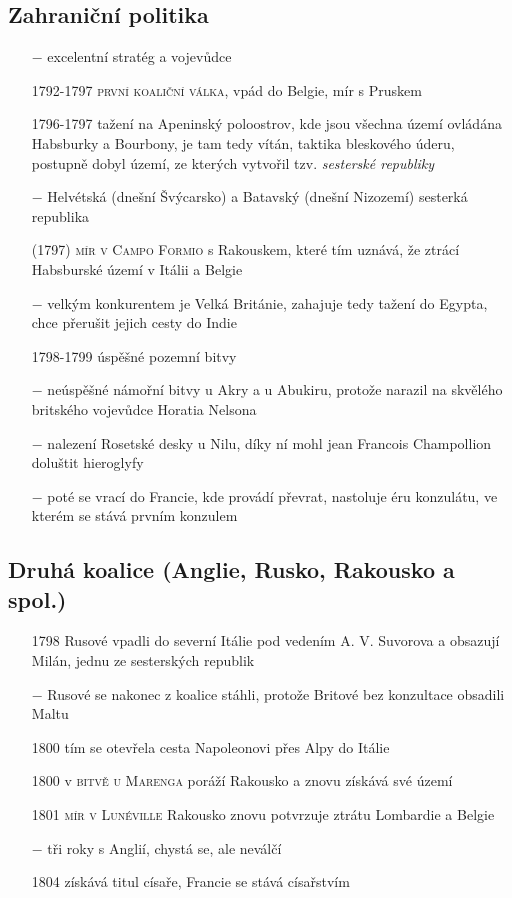 \documentclass{article}
\begin{document}
\subsection*{Zahraniční politika}
\begin{itemize}
    \vspace{-0.5em}
    \setlength\itemsep{0.15em}
    \item[$-$] excelentní stratég a vojevůdce
    \item[1792-1797] \textsc{první koaliční válka}, vpád do Belgie, mír s Pruskem
    \item[1796-1797] tažení na Apeninský poloostrov, kde jsou všechna území ovládána Habsburky a Bourbony, je tam tedy vítán, taktika bleskového úderu, postupně dobyl území, ze kterých vytvořil tzv. \textit{sesterské republiky}
    \item[$-$] Helvétská (dnešní Švýcarsko) a Batavský (dnešní Nizozemí) sesterká republika
    \item[(1797)] \textsc{mír v Campo Formio} s Rakouskem, které tím uznává, že ztrácí Habsburské území v Itálii a Belgie
    \item[$-$] velkým konkurentem je Velká Británie, zahajuje tedy tažení do Egypta, chce přerušit jejich cesty do Indie
    \item[1798-1799] úspěšné pozemní bitvy
    \item[$-$] neúspěšné námořní bitvy u Akry a u Abukiru, protože narazil na skvělého britského vojevůdce Horatia Nelsona
    \item[$-$] nalezení Rosetské desky u Nilu, díky ní mohl jean Francois Champollion doluštit hieroglyfy
    \item[$-$] poté se vrací do Francie, kde provádí převrat, nastoluje éru konzulátu, ve kterém se stává prvním konzulem
\end{itemize}

\subsection*{Druhá koalice (Anglie, Rusko, Rakousko a spol.)}
\begin{itemize}
    \vspace{-0.5em}
    \setlength\itemsep{0.15em}
    \item[1798] Rusové vpadli do severní Itálie pod vedením A. V. Suvorova a obsazují Milán, jednu ze sesterských republik
    \item[$-$] Rusové se nakonec z koalice stáhli, protože Britové bez konzultace obsadili Maltu
    \item[1800] tím se otevřela cesta Napoleonovi přes Alpy do Itálie
    \item[1800] v \textsc{bitvě u Marenga} poráží Rakousko a znovu získává své území
    \item[1801] \textsc{mír v Lunéville} Rakousko znovu potvrzuje ztrátu Lombardie a Belgie
    \item[$-$] tři roky  s Anglií, chystá se, ale neválčí
    \item[1804] získává titul císaře, Francie se stává císařstvím
\end{itemize}
\end{document}

